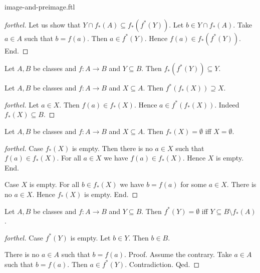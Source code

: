 \documentclass{naproche-library}
\begin{document}
\begin{smodule}[title=Computation Laws for Images and Preimages]{image-and-preimage.ftl}
\begin{proof}[forthel]
  Let us show that $Y \cap f_{*}(A) \subseteq f_{*}(f^{*}(Y))$.
    Let $b \in Y \cap f_{*}(A)$.
    Take $a \in A$ such that $b = f(a)$.
    Then $a \in f^{*}(Y)$.
    Hence $f(a) \in f_{*}(f^{*}(Y))$.
  End.
\end{proof}

\begin{corollary}[forthel,id=FOUNDATIONS_07_5585105345052672]
  Let $A, B$ be classes and $f : A \to B$ and $Y \subseteq B$.
  Then $f_{*}(f^{*}(Y)) \subseteq Y$.
\end{corollary}

\begin{proposition}[forthel,id=FOUNDATIONS_07_4890896170483712]
  Let $A, B$ be classes and $f : A \to B$ and $X \subseteq A$.
  Then $f^{*}(f_{*}(X)) \supseteq X$.
\end{proposition}
\begin{proof}[forthel]
  Let $a \in X$.
  Then $f(a) \in f_{*}(X)$.
  Hence $a \in f^{*}(f_{*}(X))$.
  Indeed $f_{*}(X) \subseteq B$.
\end{proof}

\begin{proposition}[forthel,id=FOUNDATIONS_07_3318372355801088]
  Let $A, B$ be classes and $f : A \to B$ and $X \subseteq A$.
  Then $f_{*}(X) = \emptyset$ iff $X = \emptyset$.
\end{proposition}
\begin{proof}[forthel]
  Case $f_{*}(X)$ is empty.
    Then there is no $a \in X$ such that $f(a) \in f_{*}(X)$.
    For all $a \in X$ we have $f(a) \in f_{*}(X)$.
    Hence $X$ is empty.
  End.

  Case $X$ is empty.
    For all $b \in f_{*}(X)$ we have $b = f(a)$ for some $a \in X$.
    There is no $a \in X$.
    Hence $f_{*}(X)$ is empty.
  End.
\end{proof}

\begin{proposition}[forthel,id=FOUNDATIONS_07_8597874786959360]
  Let $A, B$ be classes and $f : A \to B$ and $Y \subseteq B$.
  Then $f^{*}(Y) = \emptyset$ iff $Y \subseteq B \setminus f_{*}(A)$.
\end{proposition}
\begin{proof}[forthel]
  Case $f^{*}(Y)$ is empty.
    Let $b \in Y$.
    Then $b \in B$.

    There is no $a \in A$ such that $b = f(a)$. \newline
    Proof.
      Assume the contrary.
      Take $a \in A$ such that $b = f(a)$.
      Then $a \in f^{*}(Y)$.
      Contradiction.
    Qed.


\end{proof}
\end{smodule}
\end{document}

